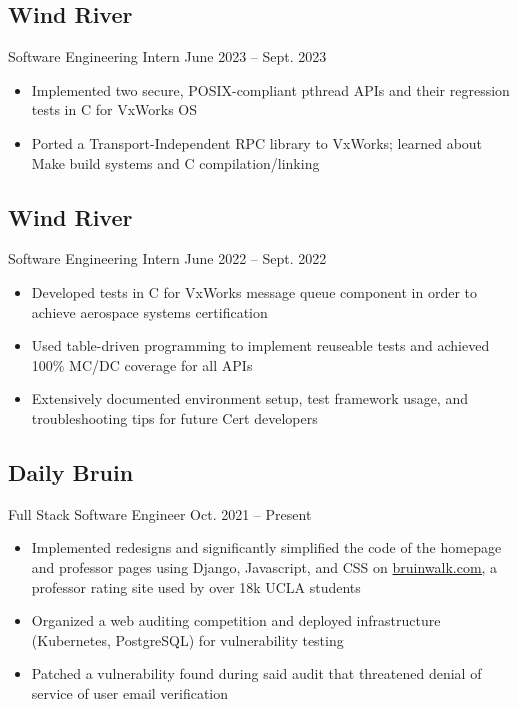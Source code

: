 \documentclass{article}
\begin{document}
\subsection*{Wind River} Software Engineering Intern
\hfill June 2023 -- Sept. 2023
\begin{itemize}
  \item Implemented two secure, POSIX-compliant pthread APIs and their
        regression tests in C for VxWorks OS

  \item Ported a Transport-Independent RPC library to VxWorks; learned about
        Make build systems and C compilation/linking
\end{itemize}

\subsection*{Wind River} Software Engineering Intern
\hfill June 2022 -- Sept. 2022
\begin{itemize}
  \item Developed tests in C for VxWorks message queue component in order to
        achieve aerospace systems certification

  \item Used table-driven programming to implement reuseable tests and achieved
        100\% MC/DC coverage for all APIs

  \item Extensively documented environment setup, test framework usage, and
        troubleshooting tips for future Cert developers
\end{itemize}

\subsection*{Daily Bruin} Full Stack Software Engineer
\hfill Oct. 2021 -- Present
\begin{itemize}
  \item Implemented redesigns and significantly simplified the code of the
        homepage and professor pages using Django, Javascript, and CSS on
        \href{https://bruinwalk.com/}{bruinwalk.com,} a professor rating site
        used by over 18k UCLA students

  \item Organized a web auditing competition and deployed infrastructure
        (Kubernetes, PostgreSQL) for vulnerability testing

  \item Patched a vulnerability found during said audit that threatened denial
        of service of user email verification
\end{itemize}
\end{document}
